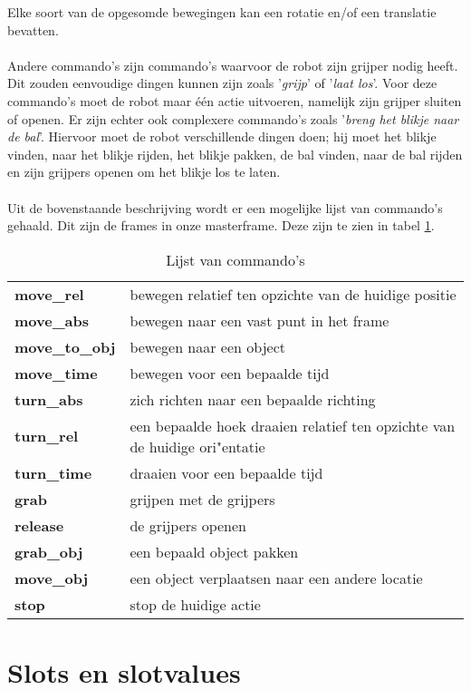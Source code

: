 Elke soort van de opgesomde bewegingen kan een rotatie en/of een translatie bevatten.  \\
\\
Andere commando's zijn commando's waarvoor de robot zijn grijper nodig heeft. Dit zouden eenvoudige dingen kunnen zijn zoals '\textit{grijp}' of '\textit{laat los}'. Voor deze commando's moet de robot maar \'e\'en actie uitvoeren, namelijk zijn grijper sluiten of openen. Er zijn echter ook complexere commando's zoals '\textit{breng het blikje naar de bal}'. Hiervoor moet de robot verschillende dingen doen; hij moet het blikje vinden, naar het blikje rijden, het blikje pakken, de bal vinden, naar de bal rijden en zijn grijpers openen om het blikje los te laten.\\
\\
Uit de bovenstaande beschrijving wordt er een mogelijke lijst van commando's gehaald. Dit zijn de frames in onze masterframe. Deze zijn te zien in tabel \ref{tab:commands}.

\begin{table}[h]
\centering
\begin{tabular}{| l | l |}
\hline
\textbf{move\_rel} &  bewegen relatief ten opzichte van de huidige positie\\
\textbf{move\_abs} & bewegen naar een vast punt in het frame\\
\textbf{move\_to\_obj} & bewegen naar een object\\
\textbf{move\_time} & bewegen voor een bepaalde tijd\\
\textbf{turn\_abs} & zich richten naar een bepaalde richting\\
\textbf{turn\_rel} & een bepaalde hoek draaien relatief ten opzichte van de huidige ori"entatie\\
\textbf{turn\_time} & draaien voor een bepaalde tijd\\
\textbf{grab} & grijpen met de grijpers\\
\textbf{release} & de grijpers openen\\
\textbf{grab\_obj} & een bepaald object pakken\\
\textbf{move\_obj} & een object verplaatsen naar een andere locatie\\
\textbf{stop} & stop de huidige actie\\
\hline
\end{tabular}
\caption{Lijst van commando's}
\label{tab:commands}
\end{table}

\section{Slots en slotvalues}
\label{sec:slots_slotvalues}

